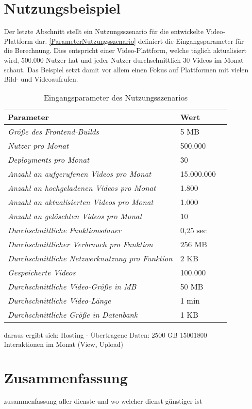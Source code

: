 \section{Nutzungsbeispiel}

Der letzte Abschnitt stellt ein Nutzungsszenario für die entwickelte Video-Plattform dar. \autoref{ParameterNutzungsszenario} definiert die Eingangsparameter für die Berechnung. Dies entspricht einer Video-Plattform, welche täglich aktualisiert wird,  500.000 Nutzer hat und jeder Nutzer durchschnittlich 30 Videos im Monat schaut. Das Beispiel setzt damit vor allem einen Fokus auf Plattformen mit vielen Bild- und Videoaufrufen.

\begin{table}[h]
  \caption{Eingangsparameter des Nutzungsszenarios}
  \label{ParameterNutzungsszenario}
  \renewcommand{\arraystretch}{1.2}
  \centering
  \sffamily
  \begin{footnotesize}
    \begin{tabularx}{0.9\textwidth}{l l l}
      \toprule
      \textbf{Parameter} & \textbf{Wert}\\
      \midrule
      \emph{Größe des Frontend-Builds} & 5 MB \\
      \emph{Nutzer pro Monat} & 500.000 \\
      \emph{Deployments pro Monat } & 30 \\
      \emph{Anzahl an aufgerufenen Videos pro Monat} & 15.000.000 \\
      \emph{Anzahl an hochgeladenen Videos pro Monat} & 1.800 \\
      \emph{Anzahl an aktualisierten Videos pro Monat} & 1.000 \\
      \emph{Anzahl an gelöschten Videos pro Monat} & 10 \\
      \emph{Durchschnittliche Funktionsdauer} & 0,25 sec \\
      \emph{Durchschnittlicher Verbrauch pro Funktion} & 256 MB \\
      \emph{Durchschnittliche Netzwerknutzung pro Funktion} & 2 KB \\
      \emph{Gespeicherte Videos} & 100.000 \\
      \emph{Durchschnittliche Video-Größe in MB} & 50 MB \\
      \emph{Durchschnittliche Video-Länge} & 1 min \\
      \emph{Durchschnittliche Größe in Datenbank} & 1 KB \\
      \bottomrule
    \end{tabularx}
  \end{footnotesize}
  \rmfamily
\end{table}

daraus ergibt sich:
Hosting - Übertragene Daten: 2500	GB
15001800	Interaktionen im Monat (View, Upload)

\section{Zusammenfassung}

zusammenfassung aller dienste und wo welcher dienst günstiger ist